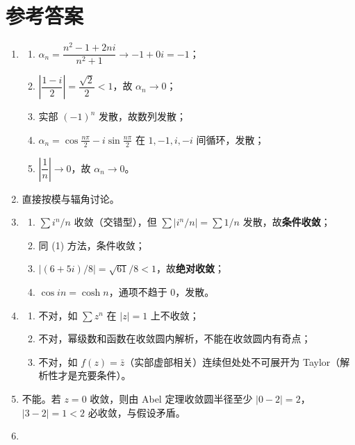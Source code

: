 \section{参考答案}\label{ux53c2ux8003ux7b54ux6848-3}

\begin{enumerate}
\def\labelenumi{\arabic{enumi}.}
\item
  \begin{enumerate}
  \def\labelenumii{(\arabic{enumii})}
  \tightlist
  \item
    \(\alpha_n=\dfrac{n^2-1+2ni}{n^2+1}\to-1+0i=-1\)；
  \item
    \(\left|\dfrac{1-i}{2}\right|=\dfrac{\sqrt2}{2}<1\)，故
    \(\alpha_n\to0\)；
  \item
    实部 \((-1)^n\) 发散，故数列发散；
  \item
    \(\alpha_n=\cos\frac{n\pi}{2}-i\sin\frac{n\pi}{2}\) 在 \(1,-1,i,-i\)
    间循环，发散；
  \item
    \(\left|\dfrac1n\right|\to0\)，故 \(\alpha_n\to0\)。
  \end{enumerate}
\item
  直接按模与辐角讨论。
\item
  \begin{enumerate}
  \def\labelenumii{(\arabic{enumii})}
  \tightlist
  \item
    \(\sum i^n/n\) 收敛（交错型），但 \(\sum|i^n/n|=\sum1/n\)
    发散，故\textbf{条件收敛}；
  \item
    同 (1) 方法，条件收敛；
  \item
    \(|(6+5i)/8|=\sqrt{61}/8<1\)，故\textbf{绝对收敛}；
  \item
    \(\cos in=\cosh n\)，通项不趋于 \(0\)，发散。
  \end{enumerate}
\item
  \begin{enumerate}
  \def\labelenumii{(\arabic{enumii})}
  \tightlist
  \item
    不对，如 \(\sum z^n\) 在 \(|z|=1\) 上不收敛；
  \item
    不对，幂级数和函数在收敛圆内解析，不能在收敛圆内有奇点；
  \item
    不对，如 \(f(z)=\bar z\)（实部虚部相关）连续但处处不可展开为
    Taylor（解析性才是充要条件）。
  \end{enumerate}
\item
  不能。若 \(z=0\) 收敛，则由 Abel 定理收敛圆半径至少
  \(|0-2|=2\)，\(|3-2|=1<2\) 必收敛，与假设矛盾。
\item
  \begin{enumerate}

\end{enumerate}
\end{enumerate}
